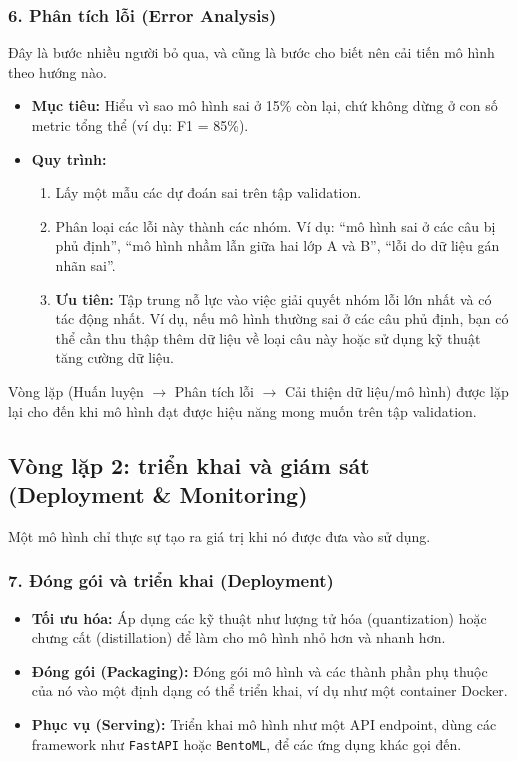 \subsubsection{6. Phân tích lỗi (Error Analysis)}
Đây là bước nhiều người bỏ qua, và cũng là bước cho biết nên cải tiến mô hình theo hướng nào.
\begin{itemize}
    \item \textbf{Mục tiêu:} Hiểu vì sao mô hình sai ở 15\% còn lại, chứ không dừng ở con số metric tổng thể (ví dụ: F1 = 85\%).
    \item \textbf{Quy trình:}
        \begin{enumerate}
            \item Lấy một mẫu các dự đoán sai trên tập validation.
            \item Phân loại các lỗi này thành các nhóm. Ví dụ: “mô hình sai ở các câu bị phủ định”, “mô hình nhầm lẫn giữa hai lớp A và B”, “lỗi do dữ liệu gán nhãn sai”.
            \item \textbf{Ưu tiên:} Tập trung nỗ lực vào việc giải quyết nhóm lỗi lớn nhất và có tác động nhất. Ví dụ, nếu mô hình thường sai ở các câu phủ định, bạn có thể cần thu thập thêm dữ liệu về loại câu này hoặc sử dụng kỹ thuật tăng cường dữ liệu.
        \end{enumerate}
\end{itemize}
Vòng lặp (Huấn luyện $\rightarrow$ Phân tích lỗi $\rightarrow$ Cải thiện dữ liệu/mô hình) được lặp lại cho đến khi mô hình đạt được hiệu năng mong muốn trên tập validation.

\subsection{Vòng lặp 2: triển khai và giám sát (Deployment \& Monitoring)}
\label{ssec:workflow_step2}
Một mô hình chỉ thực sự tạo ra giá trị khi nó được đưa vào sử dụng.

\subsubsection{7. Đóng gói và triển khai (Deployment)}
\begin{itemize}
    \item \textbf{Tối ưu hóa:} Áp dụng các kỹ thuật như lượng tử hóa (quantization) hoặc chưng cất (distillation) để làm cho mô hình nhỏ hơn và nhanh hơn.
    \item \textbf{Đóng gói (Packaging):} Đóng gói mô hình và các thành phần phụ thuộc của nó vào một định dạng có thể triển khai, ví dụ như một container Docker.
    \item \textbf{Phục vụ (Serving):} Triển khai mô hình như một API endpoint, dùng các framework như \texttt{FastAPI} hoặc \texttt{BentoML}, để các ứng dụng khác gọi đến.
\end{itemize}

